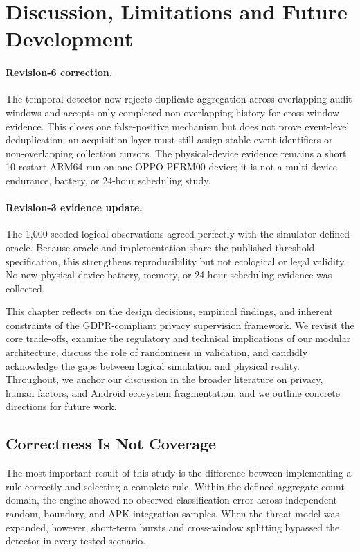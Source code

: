 \newpage
\section{Discussion, Limitations and Future Development}

\paragraph{Revision-6 correction.} The temporal detector now rejects duplicate aggregation across overlapping audit windows and accepts only completed non-overlapping history for cross-window evidence. This closes one false-positive mechanism but does not prove event-level deduplication: an acquisition layer must still assign stable event identifiers or non-overlapping collection cursors. The physical-device evidence remains a short 10-restart ARM64 run on one OPPO PERM00 device; it is not a multi-device endurance, battery, or 24-hour scheduling study.

\paragraph{Revision-3 evidence update.} The 1,000 seeded logical observations agreed perfectly with the simulator-defined oracle. Because oracle and implementation share the published threshold specification, this strengthens reproducibility but not ecological or legal validity. No new physical-device battery, memory, or 24-hour scheduling evidence was collected.

This chapter reflects on the design decisions, empirical findings, and inherent constraints of the GDPR‑compliant privacy supervision framework. We revisit the core trade‑offs, examine the regulatory and technical implications of our modular architecture, discuss the role of randomness in validation, and candidly acknowledge the gaps between logical simulation and physical reality. Throughout, we anchor our discussion in the broader literature on privacy, human factors, and Android ecosystem fragmentation, and we outline concrete directions for future work.

\subsection{Correctness Is Not Coverage}

The most important result of this study is the difference between implementing a rule correctly and selecting a complete rule. Within the defined aggregate-count domain, the engine showed no observed classification error across independent random, boundary, and APK integration samples. When the threat model was expanded, however, short-term bursts and cross-window splitting bypassed the detector in every tested scenario.

